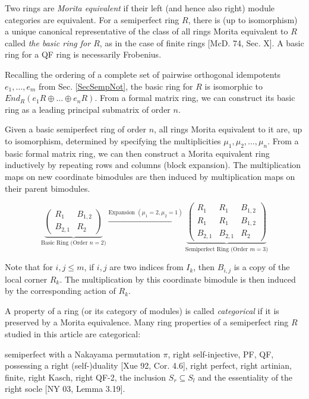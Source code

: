 \documentclass[11pt]{article}
\theoremstyle{plain}
\theoremstyle{remark}
\theoremstyle{plain}
\begin{document}
Two rings are \textit{Morita equivalent} if their left (and hence also right) module categories are equivalent.  For a semiperfect ring $R$, there is (up to isomorphism) a unique canonical representative of the class of all rings Morita equivalent to $R$ called \textit{the basic ring for $R$}, as in the case of finite rings [McD. 74, Sec. X]. A basic ring for a QF ring is necessarily Frobenius.

\smallskip 

Recalling the ordering of a complete set of pairwise orthogonal idempotents $e_1, \dots, e_m$ from Sec. \ref{SecSempNot}, the basic ring for $R$ is isomorphic to  $End_R(e_1R\oplus \dots \oplus  e_nR)$. From a formal matrix ring, we can construct its basic ring as a leading principal submatrix of order $n$.


 Given a basic semiperfect ring of order $n$, all rings Morita equivalent to it are, up to isomorphism, determined by specifying the multiplicities $\mu_1, \mu_2, \dots, \mu_n$. From a basic formal matrix ring, we can then construct a Morita equivalent ring inductively by repeating rows and columns (block expansion). The multiplication maps on new coordinate bimodules are then induced by multiplication maps on their parent bimodules. 

 \[
\underbrace{
\begin{pmatrix}
  R_1 & B_{1,2} \\
  B_{2,1} & R_2
\end{pmatrix}
}_{\text{Basic Ring (Order } n=2)}
\xrightarrow{\text{Expansion } (\mu_1=2, \mu_2=1)}
\underbrace{
\left(
\begin{array}{cc|c}
  R_1 & R_1 & B_{1,2} \\
  R_1 & R_1 & B_{1,2} \\
  \hline
  B_{2,1} & B_{2,1} & R_2
\end{array}
\right)
}_{\text{Semiperfect Ring (Order } m=3)}
\]

Note that for $i, j\leq m$,  if $i,j$ are two indices from $I_k$, then $B_{i,j}$ is a copy of the local corner $R_k$. The multiplication by this coordinate bimodule is then induced by the corresponding action of $R_k$.
 
A property of a ring (or its category of modules) is called \textit{categorical} if it is preserved by a Morita equivalence.
 Many ring properties of a semiperfect ring $R$ studied in this article are categorical:

 semiperfect with a Nakayama permutation $\pi$, right self-injective, PF, QF, possessing a right (self-)duality [Xue 92, Cor. 4.6], right perfect, right artinian, finite, right Kasch, right QF-2, the inclusion $S_r\subseteq S_l$ and the essentiality of the right socle [NY 03, Lemma 3.19].
\end{document}

